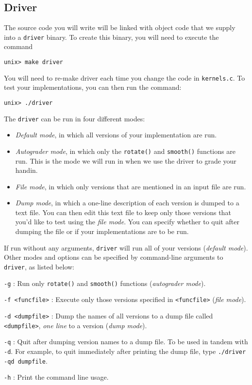 \documentclass[11pt]{article}
\begin{document}
\subsection*{Driver}
The source code you will write will be linked with object code that we
supply into a {\tt driver} binary. To create this binary, you will
need to execute the command
\small{\begin{verbatim}
unix> make driver
\end{verbatim}}
You will need to re-make driver each time you change the code in
{\tt kernels.c}.
To test your implementations, you can then run the command:
\small{\begin{verbatim}
unix> ./driver
\end{verbatim}}
The {\tt driver} can be run in four different modes:
\begin{itemize}
\item {\em Default mode}, in which all versions of your implementation are run.
\item {\em Autograder mode}, in which only the {\tt rotate()} and
{\tt smooth()} functions are run. This is the mode we will run in when
we use the driver to grade your handin.
\item {\em File mode}, in which only versions that are mentioned in
an input file are run.
\item {\em Dump mode}, in which a one-line description of each version is
dumped to a text file. You can then edit this text file to keep only
those versions that you'd like to test using the {\it file mode}.
You can specify whether to quit after dumping the file
or if your implementations are to be run.
\end{itemize}

If run without any arguments, {\tt driver} will run all of your
versions ({\em default mode}).
Other modes and options can be specified by command-line arguments to {\tt
driver}, as listed below:
\begin{description}
\item {\tt -g} : Run only {\tt rotate()} and {\tt smooth()} functions
({\em autograder mode}).
\item {\tt -f <funcfile>} :
Execute only those versions specified in \texttt{<funcfile>} ({\it file mode}).
\item {\tt -d <dumpfile>} : Dump the names of all versions to a dump file
called \texttt{<dumpfile>}, {\it one line} to a version ({\it dump mode}).
\item {\tt -q} : Quit after dumping version names to a dump file. To be
used in tandem with {\tt -d}. For example, to quit immediately after
printing the dump file, type \texttt{./driver -qd dumpfile}.
\item {\tt -h} : Print the command line usage.
\end{description}
\end{document}
